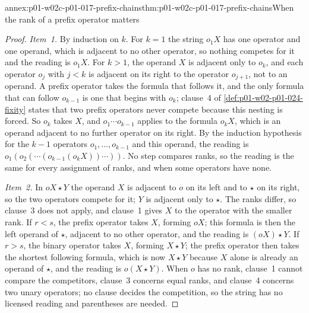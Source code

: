 \begin{annexitem}{annex:p01-w02c-p01-017-prefix-chains}{thm:p01-w02c-p01-017-prefix-chains}{When the rank of a prefix operator matters}
\begin{proof}
\emph{Item~1.}  By induction on \(k\).  For \(k=1\) the string \(o_1X\) has
one operator and one operand, which is adjacent to no other operator, so
nothing competes for it and the reading is \(o_1X\).  For \(k>1\), the
operand \(X\) is adjacent only to \(o_k\), and each operator \(o_j\) with
\(j<k\) is adjacent on its right to the operator \(o_{j+1}\), not to an
operand.  A prefix operator takes the formula that follows it, and the
only formula that can follow \(o_{k-1}\) is one that begins with \(o_k\);
clause~4 of \cref{def:p01-w02-p01-024-fixity} states that two prefix
operators never compete because this nesting is forced.  So \(o_k\) takes
\(X\), and \(o_1\cdots o_{k-1}\) applies to the formula \(o_kX\), which is
an operand adjacent to no further operator on its right.  By the induction
hypothesis for the \(k-1\) operators \(o_1,\ldots,o_{k-1}\) and this
operand, the reading is \(o_1(o_2(\cdots(o_{k-1}(o_kX))\cdots))\).  No
step compares ranks, so the reading is the same for every assignment of
ranks, and when some operators have none.

\emph{Item~2.}  In \(oX\star Y\) the operand \(X\) is adjacent to \(o\)
on its left and to \(\star\) on its right, so the two operators compete
for it; \(Y\) is adjacent only to \(\star\).  The ranks differ, so
clause~3 does not apply, and clause~1 gives \(X\) to the operator with the
smaller rank.  If \(r<s\), the prefix operator takes \(X\), forming
\(oX\); this formula is then the left operand of \(\star\), adjacent to no
other operator, and the reading is \((oX)\star Y\).  If \(r>s\), the
binary operator takes \(X\), forming \(X\star Y\); the prefix operator
then takes the shortest following formula, which is now \(X\star Y\)
because \(X\) alone is already an operand of \(\star\), and the reading
is \(o(X\star Y)\).  When \(o\) has no rank, clause~1 cannot compare the
competitors, clause~3 concerns equal ranks, and clause~4 concerns two
unary operators; no clause decides the competition, so the string has no
licensed reading and parentheses are needed.
\end{proof}
\end{annexitem}

